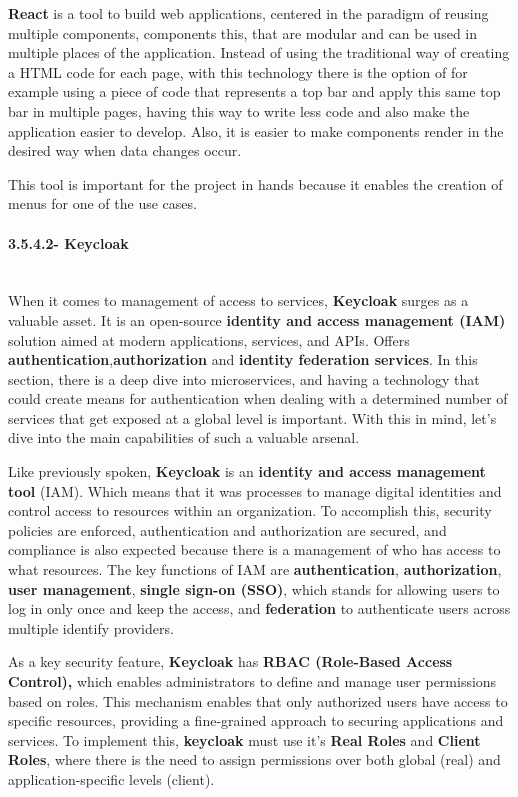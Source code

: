 \textbf{React} is a tool to build web applications, centered in the paradigm of reusing multiple components, components this, that are modular and can be used in multiple places of the application. Instead of using the traditional way of creating a HTML code for each page, with this technology there is the option of for example using a piece of code that represents a top bar and apply this same top bar in multiple pages, having this way to write less code and also make the application easier to develop. Also, it is easier to make components render in the desired way when data changes occur. 

This tool is important for the project in hands because it enables the creation of menus for one of the use cases.

\paragraph{3.5.4.2- Keycloak}\mbox{}\\
When it comes to management of access to services, \textbf{Keycloak} surges as a valuable asset. It is an open-source \textbf{identity and access management (IAM)} solution aimed at modern applications, services, and APIs. Offers \textbf{authentication},\textbf{authorization} and \textbf{identity federation services}. In this section, there is a deep dive into microservices, and having a technology that could create means for authentication when dealing with a determined number of services that get exposed at a global level is important. With this in mind, let's dive into the main capabilities of such a valuable arsenal.

Like previously spoken, \textbf{Keycloak} is an \textbf{identity and access management tool} (IAM). Which means that it was processes to manage digital identities and control access to resources within an organization. To accomplish this, security policies are enforced, authentication and authorization are secured, and compliance is also expected because there is a management of who has access to what resources. The key functions of IAM are \textbf{authentication}, \textbf{authorization}, \textbf{user management}, \textbf{single sign-on (SSO)}, which stands for allowing users to log in only once and keep the access, and \textbf{federation} to authenticate users across multiple identify providers.

As a key security feature, \textbf{Keycloak} has \textbf{RBAC (Role-Based Access Control),} which enables administrators to define and manage user permissions based on roles. This mechanism enables that only authorized users have access to specific resources, providing a fine-grained approach to securing applications and services. To implement this, \textbf{keycloak} must use it's \textbf{Real Roles} and \textbf{Client Roles}, where there is the need to assign permissions over both global (real) and application-specific levels (client).

